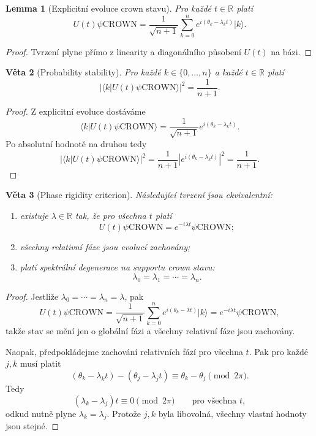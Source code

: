 \documentclass[11pt,a4paper]{article}
\newtheorem{theorem}{Věta}[section]
\newtheorem{lemma}[theorem]{Lemma}
\begin{document}
\begin{lemma}[Explicitní evoluce crown stavu]
Pro každé \(t\in\mathbb{R}\) platí
\[
U(t)\psi\mathrm{CROWN}
=
\frac{1}{\sqrt{n+1}}
\sum_{k=0}^{n} e^{i(\theta_k-\lambda_k t)}|k\rangle.
\]
\end{lemma}

\begin{proof}
Tvrzení plyne přímo z linearity a diagonálního působení \(U(t)\) na bázi.
\end{proof}

\begin{theorem}[Probability stability]
Pro každé \(k\in\{0,\dots,n\}\) a každé \(t\in\mathbb{R}\) platí
\[
|\langle k|U(t)\psi\mathrm{CROWN}\rangle|^2=\frac{1}{n+1}.
\]
\end{theorem}

\begin{proof}
Z explicitní evoluce dostáváme
\[
\langle k|U(t)\psi\mathrm{CROWN}\rangle
=
\frac{1}{\sqrt{n+1}}e^{i(\theta_k-\lambda_k t)}.
\]
Po absolutní hodnotě na druhou tedy
\[
|\langle k|U(t)\psi\mathrm{CROWN}\rangle|^2
=
\frac{1}{n+1}\left|e^{i(\theta_k-\lambda_k t)}\right|^2
=
\frac{1}{n+1}.
\]
\end{proof}

\begin{theorem}[Phase rigidity criterion]
Následující tvrzení jsou ekvivalentní:
\begin{enumerate}[label=\textbf{(\arabic*)}]
    \item existuje \(\lambda\in\mathbb{R}\) tak, že pro všechna \(t\) platí
    \[
    U(t)\psi\mathrm{CROWN}=e^{-i\lambda t}\psi\mathrm{CROWN};
    \]
    \item všechny relativní fáze jsou evolucí zachovány;
    \item platí spektrální degenerace na supportu crown stavu:
    \[
    \lambda_0=\lambda_1=\cdots=\lambda_n.
    \]
\end{enumerate}
\end{theorem}

\begin{proof}
Jestliže \(\lambda_0=\cdots=\lambda_n=\lambda\), pak
\[
U(t)\psi\mathrm{CROWN}
=
\frac{1}{\sqrt{n+1}}
\sum_{k=0}^{n} e^{i(\theta_k-\lambda t)}|k\rangle
=
e^{-i\lambda t}\psi\mathrm{CROWN},
\]
takže stav se mění jen o globální fázi a všechny relativní fáze jsou zachovány.

Naopak, předpokládejme zachování relativních fází pro všechna \(t\). Pak pro každé \(j,k\) musí platit
\[
(\theta_k-\lambda_k t)-(\theta_j-\lambda_j t)\equiv \theta_k-\theta_j \pmod{2\pi}.
\]
Tedy
\[
(\lambda_k-\lambda_j)t\equiv 0 \pmod{2\pi}
\qquad\text{pro všechna } t,
\]
odkud nutně plyne \(\lambda_k=\lambda_j\). Protože \(j,k\) byla libovolná, všechny vlastní hodnoty jsou stejné.
\end{proof}
\end{document}
